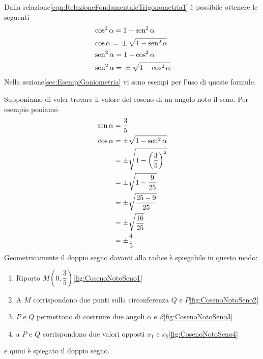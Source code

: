 Dalla relazione\nobs\vref{eqn:RelazioneFondamentaleTrigonometria1} è possibile ottenere le seguenti
\begin{align}
&\cos^{2}\alpha={}1-\operatorname{sen}^{2}\alpha\\
&\cos\alpha={}\pm\sqrt{1-\operatorname{sen}^{2}\alpha}\\
&\operatorname{sen}^{2}\alpha={}1-\cos^{2}\alpha \\
&\operatorname{sen}^{2}\alpha={}\pm\sqrt{1-\cos^{2}\alpha}
\end{align}
Nella sezione\nobs\vref{sec:EsempiGoniometria} vi sono esempi per l'uso di queste formule. 

Supponiamo di voler trovare il valore del coseno di un angolo noto il seno. Per esempio poniamo 
\begin{align*}
\operatorname{sen}\alpha&{}=\dfrac{3}{5}\\
\cos\alpha&=\pm\sqrt{1-\operatorname{sen}^2\alpha}\\
&=\pm\sqrt{1-\left(\dfrac{3}{5}\right)^2}\\
&=\pm\sqrt{1-\dfrac{9}{25}}\\
&=\pm\sqrt{\dfrac{25-9}{25}}\\
&=\pm\sqrt{\dfrac{16}{25}} \\
&=\pm\dfrac{4}{5} 
\end{align*}
Geometricamente il doppio segno davanti alla radice è spiegabile in questo modo:
\begin{enumerate}
	\item Riporto $M(0,\dfrac{3}{5})$\nobs\vref{fig:CosenoNotoSeno1}
	\item A $M$ corrispondono due punti sulla circonferenza $Q$ e $P$\nobs\vref{fig:CosenoNotoSeno2}
	\item $P$ e $Q$ permettono di costruire due angoli $\alpha$ e $\beta$\nobs\vref{fig:CosenoNotoSeno3}
	\item a $P$ e $Q$ corrispondono due valori opposti $x_1$ e $x_2$\nobs\vref{fig:CosenoNotoSeno4}
	\end{enumerate}
e quini è spiegato il doppio segno.
\begin{figure}
	\begin{subfigure}[b]{.5\linewidth}
		\caption{}\centering
		\label{fig:CosenoNotoSeno1}
	\end{subfigure}%
	\begin{subfigure}[b]{.5\linewidth}
		\centering
			\caption{}\label{fig:CosenoNotoSeno2}
	\end{subfigure}
	\begin{subfigure}[b]{.5\linewidth}
		\centering
			\caption{}\label{fig:CosenoNotoSeno3}
	\end{subfigure}%
	\begin{subfigure}[b]{.5\linewidth}
		\centering
			\caption{}\label{fig:CosenoNotoSeno4}
	\end{subfigure}
	\label{tab:CosenoNotoSenoEs1}
\end{figure}
